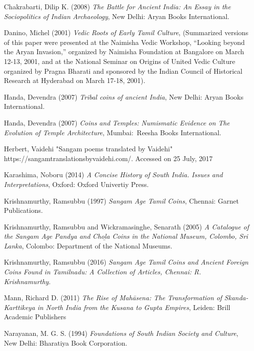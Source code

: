 \begin{thebibliography}{99}
 Chakrabarti, Dilip K. (2008) \textit{The Battle for Ancient India: An Essay in the Sociopolitics of Indian Archaeology}, New Delhi: Aryan Books International.

  Danino, Michel (2001) \textit{Vedic Roots of Early Tamil Culture}, (Summarized versions of this paper were presented at the Naimisha Vedic Workshop, “Looking beyond the Aryan Invasion,” organized by Naimisha Foundation at Bangalore on March 12-13, 2001, and at the National Seminar on Origins of United Vedic Culture organized by Pragna Bharati and sponsored by the Indian Council of Historical Research at Hyderabad on March 17-18, 2001).

  Handa, Devendra (2007) \textit{Tribal coins of ancient India}, New Delhi: Aryan Books International.

  Handa, Devendra (2007) \textit{Coins and Temples: Numismatic Evidence on The Evolution of Temple Architecture}, Mumbai: Reesha Books International.

  Herbert, Vaidehi "Sangam poems translated by Vaidehi" https://sangamtranslationsbyvaidehi.com/. Accessed on 25 July, 2017

  Karashima, Noboru (2014) \textit{A Concise History of South India. Issues and Interpretations}, Oxford: Oxford Univertiy Press.

  Krishnamurthy, Ramsubbu (1997) \textit{Sangam Age Tamil Coins}, Chennai: Garnet Publications.

  Krishnamurthy, Ramsubbu and Wickramasinghe, Senarath (2005) \textit{A Catalogue of the Sangam Age Pandya and Choḻa Coins in the National Museum, Colombo, Sri Lanka}, Colombo: Department of the National Museums.

  Krishnamurthy, Ramsubbu (2016) \textit{Sangam Age Tamil Coins and Ancient Foreign Coins Found in Tamilnadu: A Collection of Articles, Chennai: R. Krishnamurthy}.

  Mann, Richard D. (2011) \textit{The Rise of Mahāsena: The Transformation of Skanda-Karttikeya in North India from the Kusana to Gupta Empires}, Leiden: Brill Academic Publishers

  Narayanan, M. G. S. (1994) \textit{Foundations of South Indian Society and Culture}, New Delhi: Bharatiya Book Corporation.


\end{thebibliography}
